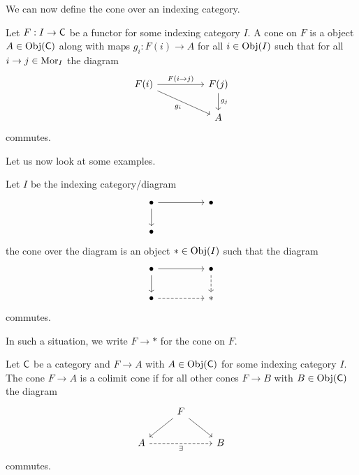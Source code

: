 We can now define the cone over an indexing category. 
\begin{definition}[Cones]
  Let $F:I\to\mathsf{C}$ be a functor for some indexing category $I$. A cone on $F$ is a object $A\in\mathrm{Obj}(\mathsf{C})$ along with maps $g_{i}:F(i)\to A$ for all $i\in\mathrm{Obj}(I)$ such that for all $i\to j\in\mathrm{Mor}_{I}$ the diagram 
  $$%
  \begin{tikzcd}
    {F(i)} && {F(j)} \\
    && A
    \arrow["{F(i\to j)}", from=1-1, to=1-3]
    \arrow["{g_{j}}", from=1-3, to=2-3]
    \arrow["{g_{i}}"', from=1-1, to=2-3]
  \end{tikzcd}$$
  commutes. 
\end{definition}
Let us now look at some examples. 
\begin{example}\label{ex:prepushout}
  Let $I$ be the indexing category/diagram
  $$%
  \begin{tikzcd}
    \bullet && \bullet \\
    \bullet
    \arrow[from=1-1, to=1-3]
    \arrow[from=1-1, to=2-1]
  \end{tikzcd}$$
  the cone over the diagram is an object $*\in\mathrm{Obj}(I)$ such that the diagram 
  $$%
  \begin{tikzcd}
    \bullet && \bullet \\
    \bullet && {*}
    \arrow[from=1-1, to=1-3]
    \arrow[from=1-1, to=2-1]
    \arrow[dashed, from=1-3, to=2-3]
    \arrow[dashed, from=2-1, to=2-3]
  \end{tikzcd}$$
  commutes. 
\end{example}
\begin{remark}
  In such a situation, we write $F\to*$ for the cone on $F$. 
\end{remark}
\begin{definition}\label{def: colimit cone}
  Let $\mathsf{C}$ be a category and $F\to A$ with $A\in\mathrm{Obj}(\mathsf{C})$ for some indexing category $I$. The cone $F\to A$ is a colimit cone if for all other cones $F\to B$ with $B\in\mathrm{Obj}(\mathsf{C})$ the diagram
  $$%
  \begin{tikzcd}
    & F \\
    A && B
    \arrow["\exists"', dashed, from=2-1, to=2-3]
    \arrow[from=1-2, to=2-1]
    \arrow[from=1-2, to=2-3]
  \end{tikzcd}$$
  commutes. 
\end{definition}
